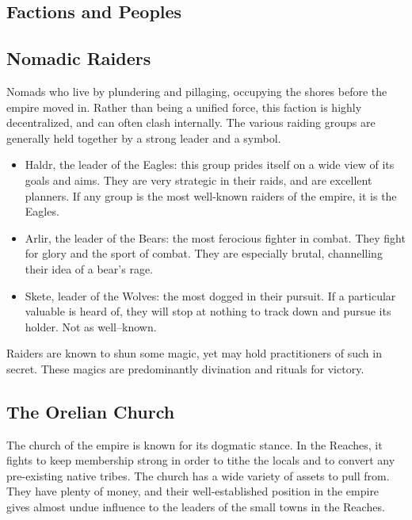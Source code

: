 \documentclass[notitlepage]{article}
\begin{document}
\begin{multicols}{2}
  \section{Factions and Peoples}
  \subsection*{Nomadic Raiders}

  Nomads who live by plundering and pillaging, occupying the shores before the empire moved in.
  Rather than being a unified force, this faction is highly decentralized, and can often clash internally.
  The various raiding groups are generally held together by a strong leader and a symbol.

  \begin{itemize}
  \item Haldr, the leader of the Eagles: this group prides itself on a wide view of its goals and aims. They are very strategic in their raids, and are excellent planners. If any group is the most well-known raiders of the empire, it is the Eagles.
  \item Arlir, the leader of the Bears: the most ferocious fighter in combat. They fight for glory and the sport of combat. They are especially brutal, channelling their idea of a bear's rage.
  \item Skete, leader of the Wolves: the most dogged in their pursuit. If a particular valuable is heard of, they will stop at nothing to track down and pursue its holder. Not as well--known.
  \end{itemize}

  Raiders are known to shun some magic, yet may hold practitioners of such in secret. These magics are predominantly divination and rituals for victory.

  \subsection*{The Orelian Church}

  The church of the empire is known for its dogmatic stance.
  In the Reaches, it fights to keep membership strong in order to tithe the locals and to convert any pre-existing native tribes.
  The church has a wide variety of assets to pull from.
  They have plenty of money, and their well-established position in the empire gives almost undue influence to the leaders of the small towns in the Reaches. \\


\end{multicols}
\end{document}
